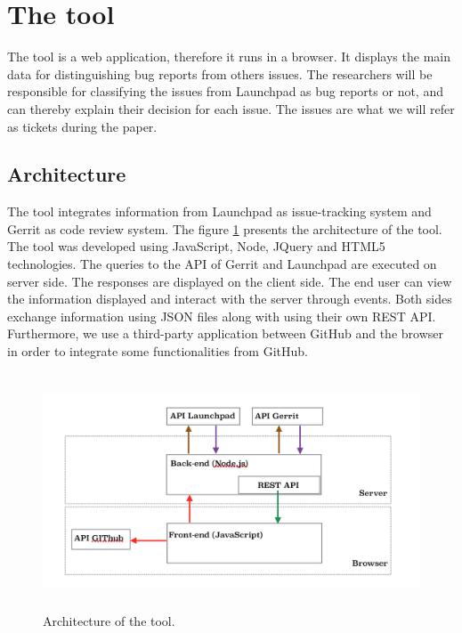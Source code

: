 \documentclass[runningheads,a4paper]{llncs}
\begin{document}
\section{The tool}
\label{sec:2}

The tool is a web application, therefore it runs in a browser. It displays the main data for distinguishing bug reports from others issues. The researchers will be responsible for classifying the issues from Launchpad as bug reports or not, and can thereby explain their decision for each issue. The issues are what we will refer as tickets during the paper.


\subsection{Architecture}

The tool integrates information from Launchpad as issue-tracking system and Gerrit as code review system. The figure \ref{fig:1} presents the architecture of the tool. The tool was developed using JavaScript, Node, JQuery and HTML5 technologies. The queries to the API of Gerrit and Launchpad are executed on server side. The responses are displayed on the client side. The end user can view the information displayed and interact with the server through events. Both sides exchange information using JSON files along with using their own REST API. Furthermore, we use a third-party application between GitHub and the browser in order to integrate some functionalities from GitHub.

\label{sec:2.1}
\begin{figure}
\centering
\includegraphics[height=7cm]{Arquitectura.png}
\caption{Architecture of the tool.}
\label{fig:1}       %
\end{figure}
\end{document}
